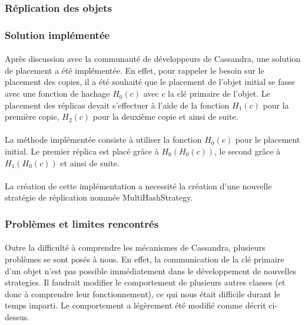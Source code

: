 \documentclass[12pt]{article}
\begin{document}
\subsubsection{Réplication des objets}

\subsubsection*{Solution implémentée}

\paragraph{}Après discussion avec la communauté de développeurs de Cassandra, une solution de placement a été implémentée. En effet, pour rappeler le besoin sur le placement des copies, il a été souhaité que le placement de l'objet initial se fasse avec une fonction de hachage $ H_0 (c) $ avec $c$ la clé primaire de l'objet. Le placement des réplicas devait s'effectuer à l'aide de la fonction $ H_1 (c) $ pour la première copie, $H_2 (c) $ pour la deuxième copie et ainsi de suite.

\paragraph{}La méthode implémentée consiste à utiliser la fonction $ H_0 (c) $ pour le placement initial. Le premier réplica est placé grâce à $ H_0 (H_0 (c)) $, le second grâce à $ H_1 (H_0 (c)) $ et ainsi de suite.

\paragraph{}La création de cette implémentation a necessité la création d'une nouvelle stratégie de réplication nommée MultiHashStrategy.

\subsubsection*{Problèmes et limites rencontrés}

\paragraph{}Outre la difficulté à comprendre les mécanismes de Cassandra, plusieurs problèmes se sont posés à nous. En effet, la communication de la clé primaire d'un objet n'est pas possible immédiatement dans le développement de nouvelles strategies. Il faudrait modifier le comportement de plusieurs autres classes (et donc à comprendre leur fonctionnement), ce qui nous était difficile durant le temps imparti. Le comportement a légèrement été modifié comme décrit ci-dessus.
\end{document}
